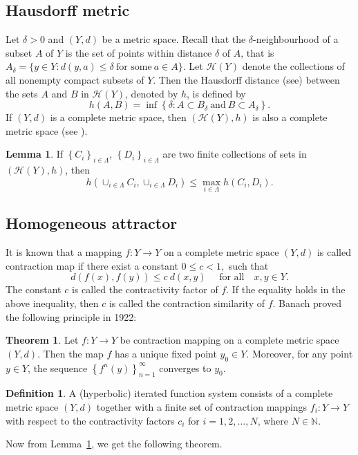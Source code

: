 \documentclass[10pt]{amsart}
\theoremstyle{definition}
\newtheorem{dfn}{Definition}[section]
\newtheorem{thm}{Theorem}[section]
\newtheorem{lm}{Lemma}[section]
\begin{document}
	\subsection{Hausdorff metric}
	Let $\delta>0$ and $(Y,d)$ be a metric space. Recall that the $\delta$-neighbourhood of a subset $A$ of $Y$ is the set of points within distance $\delta$ of $A$, that is $A_\delta=\{y\in Y: d(y,a)\leq\delta~\mbox{for some}~a \in A\}.$ Let $\mathscr{H}(Y)$ denote the collections of all nonempty compact subsets of $Y$. Then the Hausdorff distance (see\cite{FG}) between the sets $A$ and $B$ in $\mathscr{H}(Y)$, denoted by $h$, is defined by
	\begin{equation*}
		h(A,B)=\inf\left\{\delta:A\subset B_\delta~\mbox{and}~B\subset A_\delta\right\}.
	\end{equation*}
	If $(Y,d)$ is a complete metric space, then $\left ( \mathscr{H}(Y), h \right)$ is also a complete metric space (see \cite{FG,FE}).
	\begin{lm} \cite{FE}
		If $\left\{C_i\right\}_{i\in\Lambda}$, $\left\{D_i\right\}_{i\in\Lambda}$ are two finite collections of sets in $\left ( \mathscr{H}(Y), h \right)$, then $$h\left(\cup_{i\in\Lambda} C_i,\cup_{i\in\Lambda} D_i\right)\leq \max_{i\in\Lambda}h(C_i,D_i).$$
		\label{hmet}
	\end{lm}
	\subsection{Homogeneous attractor}
	It is known that a mapping $f:Y\rightarrow Y$ on a complete metric space $(Y,d)$ is called contraction map if there exist a  constant $0\leq c<1,$ such that
	$$d(f(x),f(y))\leq c~ d(x,y)\quad \mbox{ for all} \quad x,y\in Y.$$ The constant $c$ is called the contractivity factor of $f$. If the equality holds in the above inequality, then $c$ is called the contraction similarity of $f$. Banach proved the following principle in 1922:
	
	\begin{thm}\cite{FPT,TMS} Let $f:Y\rightarrow Y$ be contraction mapping on a complete metric space $(Y,d)$. Then the map $f$ has a unique fixed point $y_0\in Y$. Moreover, for any point $y\in Y$, the sequence $\left\{f^n(y)\right\}_{n=1}^\infty$ converges to $y_0$. \label{fpt}
	\end{thm}
	
	\begin{dfn}
		A (hyperbolic) iterated function system  consists of a complete metric space $(Y,d)$ together with a finite set of contraction mappings $f_i: Y\rightarrow Y$ with respect to the contractivity factors $c_i$ for $i=1,2,\ldots,N$, where $N\in\mathbb{N}$.	
	\end{dfn}
	Now from Lemma~\ref{hmet}, we get the following theorem.
	
\end{document}
